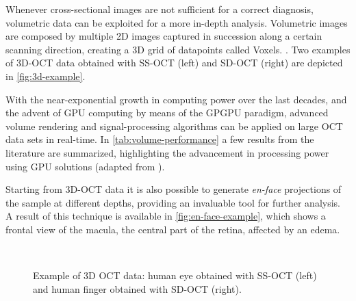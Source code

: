 Whenever cross-sectional images are not sufficient for a correct diagnosis, volumetric data can be exploited for a more in-depth analysis. Volumetric images are composed by multiple 2D images captured in succession along a certain scanning direction, creating a 3D grid of datapoints called Voxels.  . Two examples of 3D-OCT data obtained with SS-OCT (left) \citep{Dhalla2012} and SD-OCT (right) \citep{Choi2012} are depicted in \autoref{fig:3d-example}. 

With the near-exponential growth in computing power over the last decades, and the advent of \ac{GPU} computing by means of the \ac{GPGPU} paradigm, advanced volume rendering and signal-processing algorithms can be applied on large OCT data sets in real-time. In \autoref{tab:volume-performance} a few results from the literature are summarized, highlighting the advancement in processing power using GPU solutions (adapted from \citep{Darbrazi2016}).

Starting from 3D-OCT data it is also possible to generate \emph{en-face} projections of the sample at different depths, providing an invaluable tool for further analysis. A result of this technique is available in \autoref{fig:en-face-example}, which shows a frontal view of the macula, the central part of the retina, affected by an edema.

\begin{figure}[hbt]
\myfloatalign
{} \quad
{}\\
\caption{Example of 3D OCT data: human eye obtained with SS-OCT \citep{Dhalla2012} (left) and human finger obtained with SD-OCT \citep{Choi2012} (right).}\label{fig:3d-example}
\end{figure}

